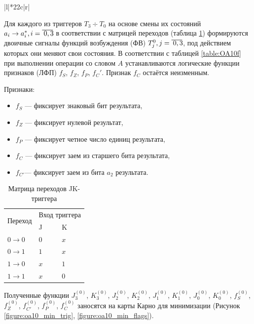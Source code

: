 \begin{landscape}
\begin{table}[H]
\begin{tabular}{|l|*{22}{c|}{r|}}
	\end{tabular}
\end{table}
\end{landscape}

Для каждого из триггеров $T_3 \div T_0$ на основе смены их состояний $a_i \rightarrow a^{*}_i, i=\oline{0,3}$ в соответствии с матрицей переходов (таблица \ref{table:JK_SMW}) формируются двоичные сигналы функций возбуждения (ФВ) $T^0_j, j=\oline{0,3}$, под действием которых они меняют свои состояния. В соответствии с таблицей \ref{table:OA10f} при выполнении операции со словом $A$ устанавливаются логические функции признаков (ЛФП) $f_S$, $f_Z$, $f_P$, $f_C'$. Признак $f_C$ остаётся неизменным.

Признаки:
\begin{itemize}
	\item $f_S$ --- фиксирует знаковый бит результата,
	\item $f_Z$ --- фиксирует нулевой результат,
	\item $f_P$ --- фиксирует четное число единиц результата,
	\item $f_C$ --- фиксирует заем из старшего бита результата,
	\item $f_{C'}$---  фиксирует заем из бита $a_2$ результата.
\end{itemize}

\begin{table}[H]
	\centering
	\caption{Матрица переходов JK-триггера}
	\label{table:JK_SMW}
	\begin{tabular}{| l | p{1cm} | p{1cm} |} \hline
		\multirow{2}{*}{Переход} & \multicolumn{2}{c|}{Вход триггера}\\ \cline{2-3}
		& J & K \\ \hline
		$0 \rightarrow 0$ & 	$0$ & $x$ \\ \hline
		$0 \rightarrow 1$ & 	$1$ & $x$ \\ \hline
		$1 \rightarrow 0$ & 	$x$ & $1$ \\ \hline
		$1 \rightarrow 1$ & 	$x$ & $0$ \\ \hline
	\end{tabular}
\end{table}

Полученные функции  $J^{(0)}_{3}$, $K^{(0)}_{3}$, $J^{(0)}_{2}$, $K^{(0)}_{2}$, $J^{(0)}_{1}$, $K^{(0)}_{1}$, $J^{(0)}_{0}$, $K^{(0)}_{0}$, $f^{(0)}_{S}$, $f^{(0)}_{Z}$, $f^{(0)}_{C'}$, $f^{(0)}_{P}$, $f^{(0)}_{C}$  заносятся на карты Карно для минимизации (Рисунок \ref{figure:oa10_min_trig}, \ref{figure:oa10_min_flags}).

